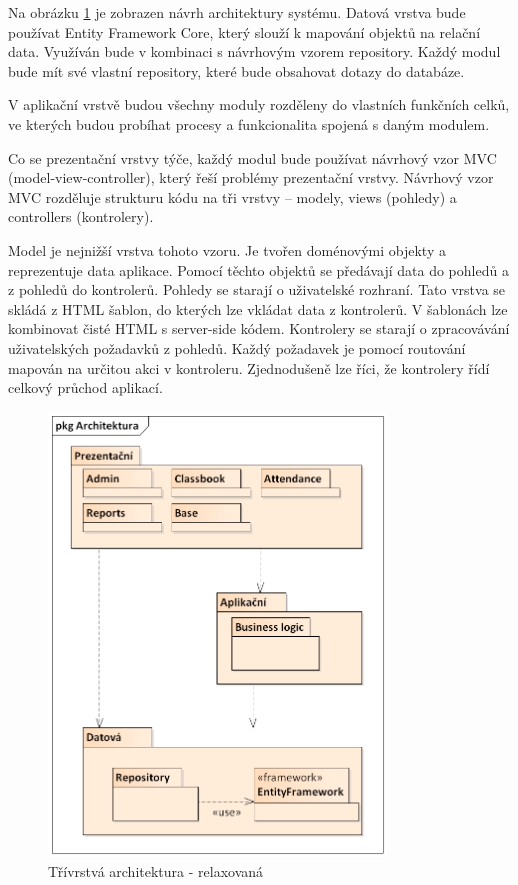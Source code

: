 Na obrázku \ref{architektura} je zobrazen návrh architektury systému. Datová vrstva bude používat Entity Framework Core, který slouží k mapování objektů na relační data. Využíván bude v kombinaci s návrhovým vzorem repository. Každý modul bude mít své vlastní repository, které bude obsahovat dotazy do databáze.

V aplikační vrstvě budou všechny moduly rozděleny do vlastních funkčních celků, ve kterých budou probíhat procesy a funkcionalita spojená s daným modulem. 

Co se prezentační vrstvy týče, každý modul bude používat návrhový vzor MVC (model-view-controller), který řeší problémy prezentační vrstvy. Návrhový vzor MVC rozděluje strukturu kódu na tři vrstvy -- modely, views (pohledy) a controllers (kontrolery).

Model je nejnižší vrstva tohoto vzoru. Je tvořen doménovými objekty a reprezentuje data aplikace. Pomocí těchto objektů se předávají data do pohledů a z pohledů do kontrolerů. Pohledy se starají o uživatelské rozhraní. Tato vrstva se skládá z HTML šablon,  do kterých lze vkládat data z kontrolerů. V šablonách lze kombinovat čisté HTML s server-side kódem. Kontrolery se starají o zpracovávání uživatelských požadavků z pohledů. Každý požadavek je pomocí routování mapován na určitou akci v kontroleru. Zjednodušeně lze říci, že kontrolery řídí celkový průchod aplikací. \cite{dp-mvc} 
\clearpage

\begin{figure}[h]
	\centering
	\includegraphics[width=0.8\textwidth]{images/architektura.png}
	\caption{Třívrstvá architektura - relaxovaná}
	\label{architektura}
\end{figure}

